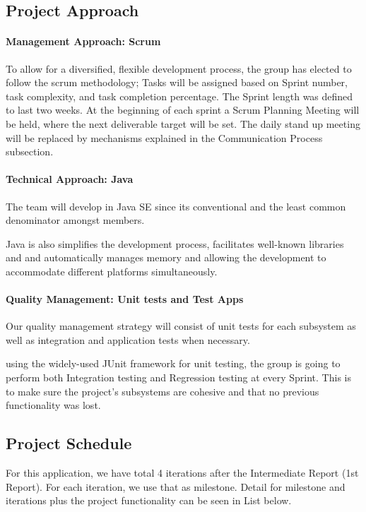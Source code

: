 \documentclass[11pt]{article}
\begin{document}
\subsection{Project Approach}
	\paragraph{Management Approach: Scrum}
	To allow for a diversified, flexible development process, the group has elected to follow the scrum methodology; Tasks will be assigned based on Sprint number, task complexity, and task completion percentage.
	The Sprint length was defined to last two weeks. At the beginning of each sprint a Scrum Planning Meeting will be held, where the next deliverable target will be set. The daily stand up meeting will be replaced by mechanisms explained in the Communication Process subsection.
	
	\paragraph{Technical Approach: Java} The team will develop in Java SE since its conventional and the least common denominator amongst members. 
	
	 Java is also simplifies the development process, facilitates well-known libraries and and automatically manages memory and allowing the development to accommodate different platforms simultaneously. 

	\paragraph{Quality Management: Unit tests and Test Apps}
	Our quality management strategy will consist of unit tests for each subsystem as well as integration and application tests when necessary.  
		
	using the widely-used JUnit framework for unit testing, the group is going to perform both Integration testing and Regression testing at every Sprint. This is to make sure the project's subsystems are cohesive and that no previous functionality was lost.
		
\subsection{Project Schedule}

 For this application, we have total 4 iterations after the Intermediate Report (1st Report). For each iteration, we use that as milestone. Detail for milestone and iterations plus the project functionality can be seen in List below.
\end{document}
